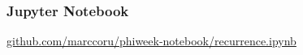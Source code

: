 \begin{frame}
	\frametitle{Jupyter Notebook}
	
	\Large
	\url{github.com/marccoru/phiweek-notebook/recurrence.ipynb}
\end{frame}
%
%
%
%
%
%
%
%
%

